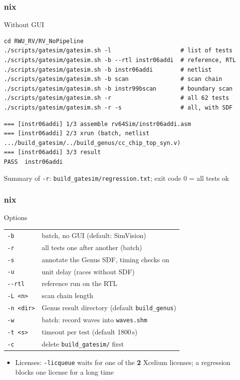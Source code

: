 \documentclass{beamer}
\newcommand{\astitle}{nix}
\newcommand{\assubtitle}{nix}
\newcommand{\cmd}[1]{\texttt{#1}}
\begin{document}
\renewcommand{\assubtitle}{Without GUI}
\begin{frame}[fragile]
\frametitle{\astitle}
\begin{block}{\assubtitle}
\begin{lstlisting}[style=sh]
cd RWU_RV/RV_NoPipeline
./scripts/gatesim/gatesim.sh -l                    # list of tests
./scripts/gatesim/gatesim.sh -b --rtl instr06addi  # reference, RTL
./scripts/gatesim/gatesim.sh -b instr06addi        # netlist
./scripts/gatesim/gatesim.sh -b scan               # scan chain
./scripts/gatesim/gatesim.sh -b instr99bscan       # boundary scan
./scripts/gatesim/gatesim.sh -r                    # all 62 tests
./scripts/gatesim/gatesim.sh -r -s                 # all, with SDF
\end{lstlisting}
\begin{lstlisting}[style=out]
=== [instr06addi] 1/3 assemble rv64Sim/instr06addi.asm
=== [instr06addi] 2/3 xrun (batch, netlist .../build_gatesim/../build_genus/cc_chip_top_syn.v)
=== [instr06addi] 3/3 result
PASS  instr06addi
\end{lstlisting}
  \scriptsize
  Summary of \cmd{-r}: \cmd{build\_gatesim/regression.txt};
  exit code 0 = all tests ok
\end{block}
\end{frame}

\renewcommand{\assubtitle}{Options}
\begin{frame}
\frametitle{\astitle}
\begin{block}{\assubtitle}
  \footnotesize
  \begin{tabularx}{\linewidth}{@{}lY@{}}
    \cmd{-b}               & batch, no GUI (default: SimVision)\\
    \cmd{-r}               & all tests one after another (batch)\\
    \cmd{-s}               & annotate the Genus SDF, timing checks on\\
    \cmd{-u}               & unit delay (races without SDF)\\
    \cmd{-{}-rtl}          & reference run on the RTL\\
    \cmd{-L <n>}           & scan chain length\\
    \cmd{-n <dir>}         & Genus result directory (default \cmd{build\_genus})\\
    \cmd{-w}               & batch: record waves into \cmd{waves.shm}\\
    \cmd{-t <s>}           & timeout per test (default 1800\,s)\\
    \cmd{-c}               & delete \cmd{build\_gatesim/} first\\
  \end{tabularx}
  \vspace{4pt}
  \begin{itemize}
    \item Licenses: \cmd{-licqueue} waits for one of the \textbf{2} Xcelium
      licenses; a regression blocks one license for a long time
  \end{itemize}
\end{block}
\end{frame}
\end{document}
